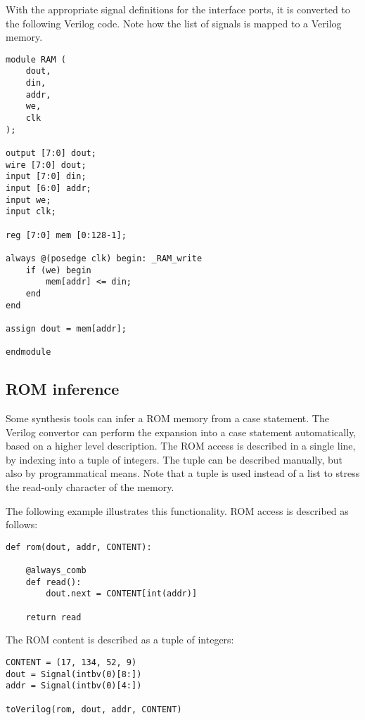 With the appropriate signal definitions for the interface ports, it is
converted to the following Verilog code. Note how the
list of signals  is mapped to a Verilog memory.

\begin{verbatim}
module RAM (
    dout,
    din,
    addr,
    we,
    clk
);

output [7:0] dout;
wire [7:0] dout;
input [7:0] din;
input [6:0] addr;
input we;
input clk;

reg [7:0] mem [0:128-1];

always @(posedge clk) begin: _RAM_write
    if (we) begin
        mem[addr] <= din;
    end
end

assign dout = mem[addr];

endmodule
\end{verbatim}


\subsection{ROM inference \label{conf-usage-ROM}}
Some synthesis tools can infer a ROM memory from a case statement. The
Verilog convertor can perform the expansion into a case statement
automatically, based on a higher level description. The ROM access is
described in a single line, by indexing into a tuple of integers. The
tuple can be described manually, but also by programmatical
means. Note that a tuple is used instead of a list to stress the
read-only character of the memory.

The following example illustrates this functionality. ROM access
is described as follows:

\begin{verbatim}
def rom(dout, addr, CONTENT):
                                                                                
    @always_comb
    def read():
        dout.next = CONTENT[int(addr)]
                                                                                
    return read
\end{verbatim}

The ROM content is described as a tuple of integers:

\begin{verbatim}
CONTENT = (17, 134, 52, 9)
dout = Signal(intbv(0)[8:])
addr = Signal(intbv(0)[4:])
                                                                                
toVerilog(rom, dout, addr, CONTENT)
\end{verbatim}

